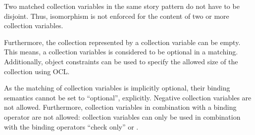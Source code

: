 {Two matched collection variables in the same story pattern do not have to be disjoint.
Thus, isomorphism is not enforced for the content of two or more collection variables.

Furthermore, the collection represented by a collection variable can be empty.
This means, a collection variables is considered to be optional in a matching.
Additionally, object constraints can be used to specify the allowed size of
the collection using OCL.

As the matching of collection variables is implicitly optional, their binding semantics cannot be set to ``optional'', explicitly.
Negative collection variables are not allowed.
Furthermore, collection variables in combination with a \create binding operator
are not allowed: collection variables can only be used in combination with the
binding operators ``check only'' or \destroy.






}%

